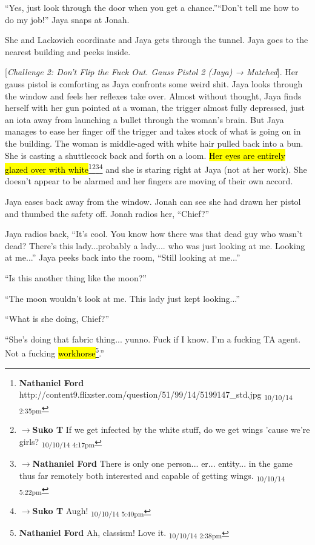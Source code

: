 ``Yes, just look through the door when you get a chance.''``Don't tell me how to do my job!'' Jaya snaps at Jonah.  

She and Lackovich coordinate and Jaya gets through the tunnel.  Jaya goes to the nearest building and peeks inside.

{[}\textit{Challenge 2: Don't Flip the Fuck Out.  Gauss Pistol 2 (Jaya) → Matched}{]}.   Her gauss pistol is comforting as Jaya confronts some weird shit.  Jaya looks through the window and feels her reflexes take over.  Almost without thought, Jaya finds herself with her gun pointed at a woman, the trigger almost fully depressed, just an iota away from launching a bullet through the woman's brain.  But Jaya manages to ease her finger off the trigger and takes stock of what is going on in the building.  The woman is middle-aged with white hair pulled back into a bun.  She is casting a shuttlecock back and forth on a loom.  \hl{Her eyes are entirely glazed over with white}\footnote{\textbf{Nathaniel Ford }http://content9.flixster.com/question/51/99/14/5199147\_std.jpg \textsubscript{10/10/14 2:35pm}}\footnote{$\rightarrow$\textbf{Suko T }If we get infected by the white stuff, do we get wings 'cause we're girls? \textsubscript{10/10/14 4:17pm}}\footnote{$\rightarrow$\textbf{Nathaniel Ford }There is only one person... er... entity... in the game thus far remotely both interested and capable of getting wings. \textsubscript{10/10/14 5:22pm}}\footnote{$\rightarrow$\textbf{Suko T }Augh!  \textsubscript{10/10/14 5:40pm}} and she is staring right at Jaya (not at her work).  She doesn't appear to be alarmed and her fingers are moving of their own accord.



Jaya eases back away from the window.  Jonah can see she had drawn her pistol and thumbed the safety off.  Jonah radios her, ``Chief?''

Jaya radios back, ``It's cool.  You know how there was that dead guy who wasn't dead?  There's this lady...probably a lady.... who was just looking at me.  Looking at me...'' Jaya peeks back into the room, ``Still looking at me...''

``Is this another thing like the moon?''

``The moon wouldn't look at me.  This lady just kept looking...''

``What is she doing, Chief?''

``She's doing that fabric thing... yunno.  Fuck if I know.  I'm a fucking TA agent.  Not a fucking \hl{workhorse}\footnote{\textbf{Nathaniel Ford }Ah, classism! Love it. \textsubscript{10/10/14 2:38pm}}.''

